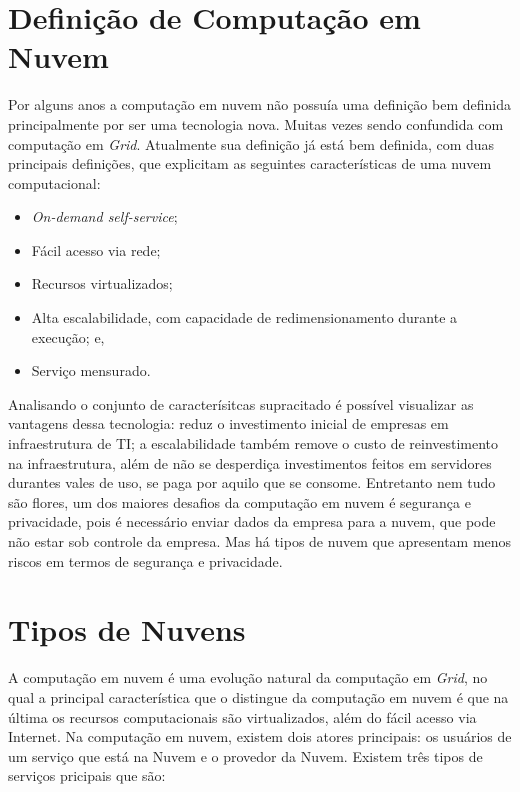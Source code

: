 \section{Definição de Computação em Nuvem}

Por alguns anos a computação em nuvem não possuía uma definição bem definida principalmente por ser uma tecnologia nova. Muitas vezes sendo confundida com computação em \textit{Grid}. Atualmente sua definição já está bem definida, com duas principais definições\cite{NIST_CLOUD_DEFINITION}\cite{Vaquero:2008:BCT:1496091.1496100_Cloud_definition}, que explicitam as seguintes características de uma nuvem computacional: 

\begin{itemize}
	\item \textit{On-demand self-service};
	\item Fácil acesso via rede;
	\item Recursos virtualizados;
	\item Alta escalabilidade, com capacidade de redimensionamento durante a execução; e,
	\item Serviço mensurado.
\end{itemize}

Analisando o conjunto de caracterísitcas supracitado é possível visualizar as vantagens dessa tecnologia: reduz o investimento inicial de empresas em infraestrutura de TI; a escalabilidade também remove o custo de reinvestimento na infraestrutura, além de não se desperdiça investimentos feitos em servidores durantes vales de uso, se paga por aquilo que se consome. Entretanto nem tudo são flores, um dos maiores desafios da computação em nuvem é segurança e privacidade, pois é necessário enviar dados da empresa para a nuvem, que pode não estar sob controle da empresa. Mas há tipos de nuvem que apresentam menos riscos em termos de segurança e privacidade.

\section{Tipos de Nuvens}

A computação em nuvem é uma evolução natural da computação em \textit{Grid}, no qual a principal característica que o distingue da computação em nuvem é que na última os recursos computacionais são virtualizados, além do fácil acesso via Internet. Na computação em nuvem, existem dois atores principais: os usuários de um serviço que está na Nuvem e o provedor da Nuvem. Existem três tipos de serviços pricipais que são\cite{NIST_CLOUD_DEFINITION}:

